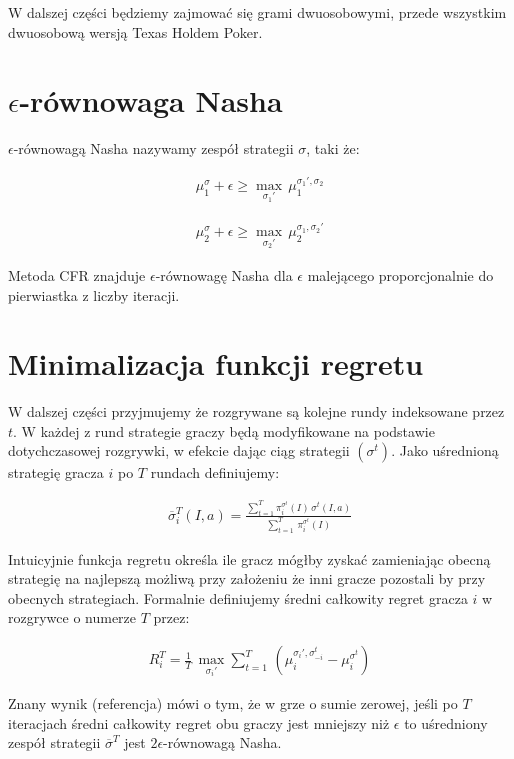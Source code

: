 \documentclass[licencjacka]{pracamgr}
\begin{document}
\noindent
W dalszej części będziemy zajmować się grami dwuosobowymi, przede wszystkim dwuosobową wersją Texas Holdem Poker.

\section{$\epsilon$-równowaga Nasha}

$\epsilon$-równowagą Nasha nazywamy zespół strategii $\sigma$, taki że:

\begin{align*}
\mu_1^{\sigma} + \epsilon \geq  \max_{\sigma_1'} \, \mu_1^{\sigma_1', \sigma_2} 
\end{align*}

\begin{align*}
\mu_2^{\sigma} + \epsilon \geq  \max_{\sigma_2'} \, \mu_2^{\sigma_1, \sigma_2'} 
\end{align*}

\noindent
Metoda CFR znajduje $\epsilon$-równowagę Nasha dla $\epsilon$ malejącego proporcjonalnie do pierwiastka z liczby iteracji.

\section{Minimalizacja funkcji regretu}

W dalszej części przyjmujemy że rozgrywane są kolejne rundy indeksowane przez $t$. W każdej z rund
strategie graczy będą modyfikowane na podstawie dotychczasowej rozgrywki, w efekcie dając ciąg strategii
$(\sigma^t)$. Jako uśrednioną strategię gracza $i$ po $T$ rundach definiujemy:

\begin{align*}
\overline{\sigma}_i^T(I, a) = \frac{\sum\limits_{t=1}^T \pi_i^{\sigma^t}(I) \, \sigma^t(I, a)}{\sum\limits_{t=1}^T \, \pi_i^{\sigma^t}(I)}
\end{align*}

\noindent
Intuicyjnie funkcja regretu określa ile gracz mógłby zyskać zamieniając obecną strategię na najlepszą możliwą
przy założeniu że inni gracze pozostali by przy obecnych strategiach. Formalnie definiujemy średni całkowity regret gracza $i$
w rozgrywce o numerze $T$ przez:

\begin{align*}
R_i^T = \frac{1}{T} \, \max_{\sigma_i'} \sum\limits_{t=1}^T \, (\mu_i^{\sigma_i', \sigma_{-i}^t} - \mu_i^{\sigma^t})
\end{align*}

\noindent
Znany wynik (referencja) mówi o tym, że w grze o sumie zerowej, jeśli po $T$ iteracjach średni całkowity regret obu graczy
jest mniejszy niż $\epsilon$ to uśredniony zespół strategii $\overline{\sigma}^T$ jest $2\epsilon$-równowagą Nasha.
\end{document}
